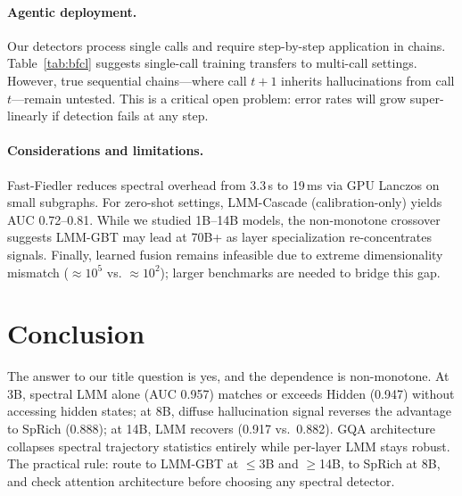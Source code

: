 \documentclass{article}
\begin{document}
\paragraph{Agentic deployment.}
Our detectors process single calls and require step-by-step application in chains. Table~\ref{tab:bfcl} suggests single-call training transfers to multi-call settings. However, true sequential chains---where call $t{+}1$ inherits hallucinations from call $t$---remain untested. This is a critical open problem: error rates will grow super-linearly if detection fails at any step.

\paragraph{Considerations and limitations.}
Fast-Fiedler reduces spectral overhead from 3.3\,s to 19\,ms via GPU Lanczos on small subgraphs. For zero-shot settings, LMM-Cascade (calibration-only) yields AUC 0.72--0.81. While we studied 1B--14B models, the non-monotone crossover suggests LMM-GBT may lead at 70B+ as layer specialization re-concentrates signals. Finally, learned fusion remains infeasible due to extreme dimensionality mismatch (${\approx}10^5$ vs. ${\approx}10^2$); larger benchmarks are needed to bridge this gap.

\section{Conclusion}

The answer to our title question is yes, and the dependence is
non-monotone.  At 3B, spectral LMM alone (AUC 0.957) matches or
exceeds Hidden (0.947) without accessing hidden states; at 8B, diffuse
hallucination signal reverses the advantage to SpRich (0.888); at 14B,
LMM recovers (0.917 vs.\ 0.882).  GQA architecture collapses spectral
trajectory statistics entirely while per-layer LMM stays robust.  The
practical rule: route to LMM-GBT at ${\leq}$3B and ${\geq}$14B, to
SpRich at 8B, and check attention architecture before choosing any
spectral detector.  


\newpage


\end{document}
